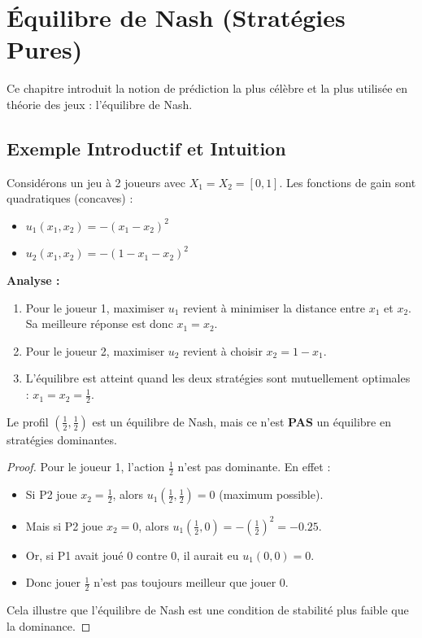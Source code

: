 \chapter{Équilibre de Nash (Stratégies Pures)}

Ce chapitre introduit la notion de prédiction la plus célèbre et la plus utilisée en théorie des jeux : l'équilibre de Nash.

\section{Exemple Introductif et Intuition}
Considérons un jeu à 2 joueurs avec $X_1 = X_2 = [0,1]$. Les fonctions de gain sont quadratiques (concaves) :
\begin{itemize}
    \item $u_1(x_1, x_2) = -(x_1 - x_2)^2$
    \item $u_2(x_1, x_2) = -(1 - x_1 - x_2)^2$
\end{itemize}

\textbf{Analyse :}
\begin{enumerate}
    \item Pour le joueur 1, maximiser $u_1$ revient à minimiser la distance entre $x_1$ et $x_2$. Sa meilleure réponse est donc $x_1 = x_2$.
    \item Pour le joueur 2, maximiser $u_2$ revient à choisir $x_2 = 1 - x_1$.
    \item L'équilibre est atteint quand les deux stratégies sont mutuellement optimales : $x_1 = x_2 = \frac{1}{2}$.
\end{enumerate}

\begin{remarque}
Le profil $(\frac{1}{2}, \frac{1}{2})$ est un équilibre de Nash, mais ce n'est \textbf{PAS} un équilibre en stratégies dominantes.
\begin{proof}
Pour le joueur 1, l'action $\frac{1}{2}$ n'est pas dominante. En effet :
\begin{itemize}
    \item Si P2 joue $x_2 = \frac{1}{2}$, alors $u_1(\frac{1}{2}, \frac{1}{2}) = 0$ (maximum possible).
    \item Mais si P2 joue $x_2 = 0$, alors $u_1(\frac{1}{2}, 0) = -(\frac{1}{2})^2 = -0.25$.
    \item Or, si P1 avait joué $0$ contre $0$, il aurait eu $u_1(0,0) = 0$.
    \item Donc jouer $\frac{1}{2}$ n'est pas toujours meilleur que jouer $0$.
\end{itemize}
Cela illustre que l'équilibre de Nash est une condition de stabilité plus faible que la dominance.
\end{proof}
\end{remarque}

